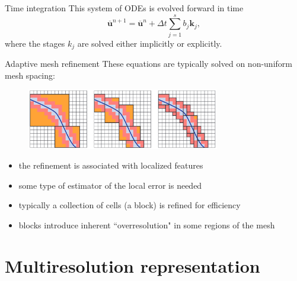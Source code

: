\documentclass{beamer}
\begin{document}
\begin{frame}{Time integration}
    This system of ODEs is evolved forward in time
    \begin{equation}
        \overline{\bm{u}}^{n+1} = \overline{\bm{u}}^{n} + \Delta t \sum_{j=1}^{s} b_{j}
        \bm{k}_{j},
    \end{equation}
    where the stages $k_{j}$ are solved either implicitly or explicitly.
\end{frame}

\begin{frame}{Adaptive mesh refinement}
    These equations are typically solved on non-uniform mesh spacing:
    \begin{figure}
        \center
        \includegraphics[width=0.75\textwidth]{filling.png}
    \end{figure}
    \begin{itemize}
        \item<2-> the refinement is associated with localized features
        \item<3-> some type of estimator of the local error is needed
        \item<4-> typically a collection of cells (a block) is refined for efficiency
        \item<5-> blocks introduce inherent ``overresolution" in some regions of the mesh
    \end{itemize}
\end{frame}


\section{Multiresolution representation}
\end{document}
